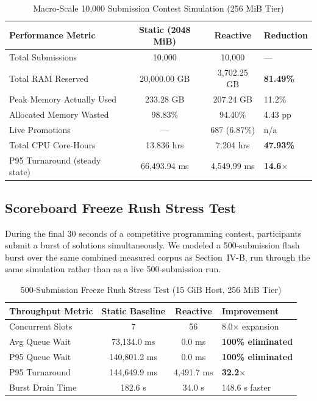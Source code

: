 \documentclass[conference]{IEEEtran}
\begin{document}
\begin{table}[!t]
\caption{Macro-Scale 10,000 Submission Contest Simulation (256 MiB Tier)}
\label{tab:macro_sim}
\centering
\scriptsize
\begin{tabular}{|P{2.4cm}|c|c|P{1.6cm}|}
\hline
\textbf{Performance Metric} & \textbf{Static (2048 MiB)} & \textbf{Reactive} & \textbf{Reduction} \\
\hline
Total Submissions & 10,000 & 10,000 & --- \\
\hline
Total RAM Reserved & 20,000.00 GB & 3,702.25 GB & \textbf{81.49\%} \\
\hline
Peak Memory Actually Used & 233.28 GB & 207.24 GB & 11.2\% \\
\hline
Allocated Memory Wasted & 98.83\% & 94.40\% & 4.43 pp \\
\hline
Live Promotions & --- & 687 (6.87\%) & n/a \\
\hline
Total CPU Core-Hours & 13.836 hrs & 7.204 hrs & \textbf{47.93\%} \\
\hline
P95 Turnaround (steady state) & 66,493.94 ms & 4,549.99 ms & \textbf{14.6$\times$} \\
\hline
\end{tabular}
\end{table}

\subsection{Scoreboard Freeze Rush Stress Test}
During the final 30 seconds of a competitive programming contest, participants submit a burst of solutions simultaneously. We modeled a 500-submission flash burst over the same combined measured corpus as Section~IV-B, run through the same simulation rather than as a live 500-submission run.

\begin{table}[!t]
\caption{500-Submission Freeze Rush Stress Test (15 GiB Host, 256 MiB Tier)}
\label{tab:burst_stress}
\centering
\scriptsize
\begin{tabularx}{\columnwidth}{|Y|c|c|Y|}
\hline
\textbf{Throughput Metric} & \textbf{Static Baseline} & \textbf{Reactive} & \textbf{Improvement} \\
\hline
Concurrent Slots & 7 & 56 & 8.0$\times$ expansion \\
\hline
Avg Queue Wait & 73,134.0 ms & 0.0 ms & \textbf{100\% eliminated} \\
\hline
P95 Queue Wait & 140,801.2 ms & 0.0 ms & \textbf{100\% eliminated} \\
\hline
P95 Turnaround & 144,649.9 ms & 4,491.7 ms & \textbf{32.2$\times$} \\
\hline
Burst Drain Time & 182.6 s & 34.0 s & 148.6 s faster \\
\hline
\end{tabularx}
\end{table}
\end{document}
